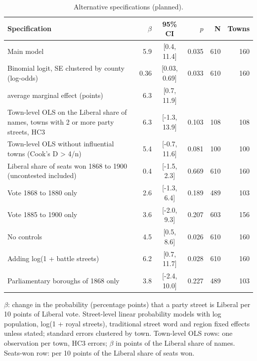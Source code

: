 \documentclass[11pt,a4paper]{article}
\begin{document}
\begin{table}[tbp]\centering\footnotesize\begin{threeparttable}\caption{Alternative specifications (planned).}\label{tab:alt}\begin{tabular}{p{7.2cm}rcrrr}\toprule Specification & $\beta$ & 95\% CI & $p$ & N & Towns\\\midrule
Main model & 5.9 & [0.4, 11.4] & 0.035 & 610 & 160\\
Binomial logit, SE clustered by county (log-odds) & 0.36 & [0.03, 0.69] & 0.033 & 610 & 160\\
\quad average marginal effect (points) & 6.3 & [0.7, 11.9] & & & \\
Town-level OLS on the Liberal share of names, towns with 2 or more party streets, HC3 & 6.3 & [-1.3, 13.9] & 0.103 & 108 & 108\\
Town-level OLS without influential towns (Cook's D > 4/n) & 5.4 & [-0.7, 11.6] & 0.081 & 100 & 100\\
Liberal share of seats won 1868 to 1900 (uncontested included) & 0.4 & [-1.5, 2.3] & 0.669 & 610 & 160\\
Vote 1868 to 1880 only & 2.6 & [-1.3, 6.4] & 0.189 & 489 & 103\\
Vote 1885 to 1900 only & 3.6 & [-2.0, 9.3] & 0.207 & 603 & 156\\
No controls & 4.5 & [0.5, 8.6] & 0.026 & 610 & 160\\
Adding log(1 + battle streets) & 6.2 & [0.7, 11.7] & 0.028 & 610 & 160\\
Parliamentary boroughs of 1868 only & 3.8 & [-2.4, 10.0] & 0.227 & 489 & 103\\
\bottomrule\end{tabular}\begin{tablenotes}\footnotesize\item $\beta$: change in the probability (percentage points) that a party street is Liberal per 10 points of Liberal vote. Street-level linear probability models with log population, log(1 + royal streets), traditional street word and region fixed effects unless stated; standard errors clustered by town. Town-level OLS rows: one observation per town, HC3 errors; $\beta$ in points of the Liberal share of names. Seats-won row: per 10 points of the Liberal share of seats won.\end{tablenotes}\end{threeparttable}\end{table}
\end{document}
